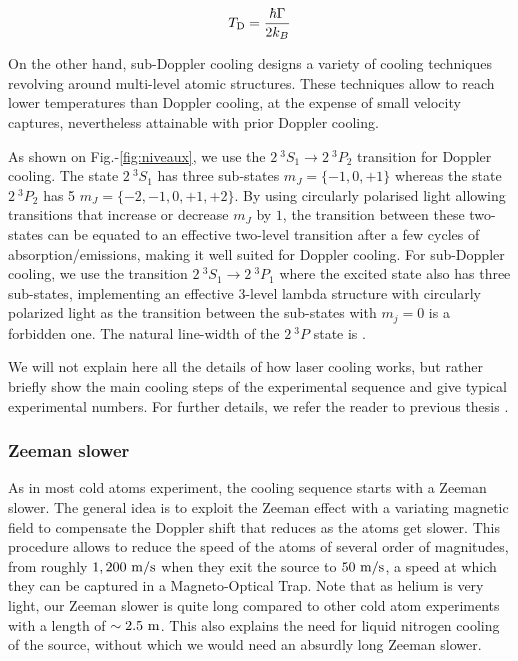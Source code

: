 \begin{equation}
    T_{\rm{D}} = \frac{\hbar \Gamma}{2 k_B}
\end{equation}

 On the other hand, sub-Doppler cooling designs a variety of cooling techniques revolving around multi-level atomic structures. These techniques allow to reach lower temperatures than Doppler cooling, at the expense of small velocity captures, nevertheless attainable with prior Doppler cooling. 

As shown on Fig.-\ref{fig:niveaux}, we use the $2 \ ^3 S_1 \rightarrow 2 \ ^3 P_2$ transition for Doppler cooling. The state $2 \ ^3 S_1$ has three sub-states $m_J=\{-1,0,+1\}$ whereas the state $2 \ ^3 P_2$ has 5 $m_J=\{-2,-1,0,+1,+2\}$. By using circularly polarised light allowing transitions that increase or decrease $m_J$ by $1$, the transition between these two-states can be equated to an effective two-level transition after a few cycles of absorption/emissions, making it well suited for Doppler cooling. For sub-Doppler cooling, we use the transition  $2 \ ^3 S_1 \rightarrow 2 \ ^3 P_1$ where the excited state also has three sub-states, implementing an effective 3-level lambda structure with circularly polarized light as the transition between the sub-states with $m_j=0$ is a forbidden one. The natural line-width of the $2 \ ^3 P$ state is .

We will not explain here all the details of how laser cooling works, but rather briefly show the main cooling steps of the experimental sequence and give typical experimental numbers. For further details, we refer the reader to previous thesis \cite{bouton_these,cayla_these,hoend2014}.



\subsubsection{Zeeman slower}

As in most cold atoms experiment, the cooling sequence starts with a Zeeman slower. The general idea is to exploit the Zeeman effect with a variating magnetic field to compensate the Doppler shift that reduces as the atoms get slower. This procedure allows to reduce the speed of the atoms of several order of magnitudes, from roughly $1,200 \ \rm{m/s}$ when they exit the source to $50 \ \rm{m/s}$, a speed at which they can be captured in a Magneto-Optical Trap. Note that as helium is very light, our Zeeman slower is quite long compared to other cold atom experiments with a length of $\sim 2.5 \ \rm{m}$. This also explains the need for liquid nitrogen cooling of the source, without which we would need an absurdly long Zeeman slower.

